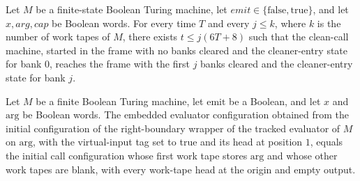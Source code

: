 \begin{lemma}
\label{Turing.FinTM.emCall_banks_run}
\leanok
{}
Let $M$ be a finite-state Boolean Turing machine, let
$\mathit{emit}\in\{\mathrm{false},\mathrm{true}\}$, and let
$x,\mathit{arg},\mathit{cap}$ be Boolean words. For every time $T$ and every $j\le k$,
where $k$ is the number of work tapes of $M$, there exists $t\le j(6T+8)$ such that the
clean-call machine, started in the frame with no banks cleared and the cleaner-entry
state for bank $0$, reaches the frame with the first $j$ banks cleared and the
cleaner-entry state for bank $j$.
\end{lemma}

\begin{lemma}
\label{Turing.FinTM.emCall_prepare_initial}
\leanok
{}
Let $M$ be a finite Boolean Turing machine, let $\mathrm{emit}$ be a Boolean, and let
$x$ and $\mathrm{arg}$ be Boolean words. The embedded evaluator configuration obtained
from the initial configuration of the right-boundary wrapper of the tracked evaluator of
$M$ on $\mathrm{arg}$, with the virtual-input tag set to true and its head at position
$1$, equals the initial call configuration whose first work tape stores $\mathrm{arg}$
and whose other work tapes are blank, with every work-tape head at the origin and empty
output.
\end{lemma}

